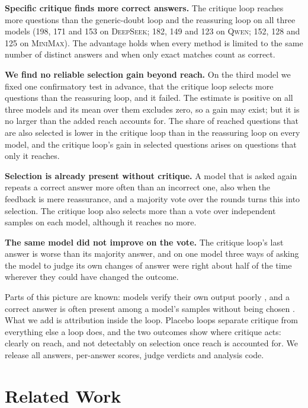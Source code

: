 \documentclass[11pt]{article}
\newcommand{\ds}{\textsc{DeepSeek}}
\newcommand{\qw}{\textsc{Qwen}}
\newcommand{\mm}{\textsc{MiniMax}}
\begin{document}
\textbf{Specific critique finds more correct answers.}
The critique loop reaches more questions than the generic-doubt loop and the reassuring loop on all three models (198, 171 and 153 on \ds; 182, 149 and 123 on \qw; 152, 128 and 125 on \mm).
The advantage holds when every method is limited to the same number of distinct answers and when only exact matches count as correct.

\textbf{We find no reliable selection gain beyond reach.}
On the third model we fixed one confirmatory test in advance, that the critique loop selects more questions than the reassuring loop, and it failed.
The estimate is positive on all three models and its mean over them excludes zero, so a gain may exist; but it is no larger than the added reach accounts for.
The share of reached questions that are also selected is lower in the critique loop than in the reassuring loop on every model, and the critique loop's gain in selected questions arises on questions that only it reaches.

\textbf{Selection is already present without critique.}
A model that is asked again repeats a correct answer more often than an incorrect one, also when the feedback is mere reassurance, and a majority vote over the rounds turns this into selection.
The critique loop also selects more than a vote over independent samples on each model, although it reaches no more.

\textbf{The same model did not improve on the vote.}
The critique loop's last answer is worse than its majority answer, and on one model three ways of asking the model to judge its own changes of answer were right about half of the time wherever they could have changed the outcome.

Parts of this picture are known: models verify their own output poorly \citep{huang2024cannot,stechly2024selfverification,song2024mindgap}, and a correct answer is often present among a model's samples without being chosen \citep{brown2024monkeys,jain2026cliff}.
What we add is attribution inside the loop.
Placebo loops separate critique from everything else a loop does, and the two outcomes show where critique acts: clearly on reach, and not detectably on selection once reach is accounted for.
We release all answers, per-answer scores, judge verdicts and analysis code.

\section{Related Work}
\end{document}
